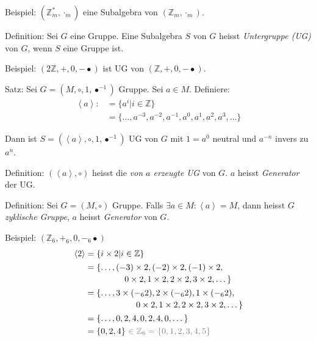 \documentclass[a4paper, ngerman, landscape, fleqn]{article}
\begin{document}
\begin{multicols*}{3}
Beispiel: $(\mathbb{Z}^*_m, \cdot_m)$ eine Subalgebra von $(\mathbb{Z}_m, \cdot_m)$.

Definition: Sei $G$ eine Gruppe. Eine Subalgebra $S$ von $G$ heisst \emph{Untergruppe (UG)} von $G$, wenn $S$ eine Gruppe ist.

Beispiel: $(2\mathbb{Z}, +, 0, -\bullet)$ ist UG von $(\mathbb{Z}, +, 0, -\bullet)$.

Satz: Sei $G = (M, \circ, 1, \bullet^{-1})$ Gruppe. Sei $a \in M$.
Definiere:
\begin{align*}
    \left< a \right> :&= \{ a^i | i \in \mathbb{Z} \} \\
                      &= \{ \dotsc, a^{-3}, a^{-2}, a^{-1}, a^{0}, a^1, a^2, a^3, \dotsc \}
\end{align*}

Dann ist $S = (\left< a \right>, \circ, 1, \bullet^{-1})$ UG von $G$ mit $1 = a^0$ neutral und $a^{-n}$ invers zu $a^n$.

Definition: $(\left<a\right>, \circ)$ heisst die \emph{von $a$ erzeugte UG} von $G$. $a$ heisst \emph{Generator} der UG.

Definition: Sei $G = (M, \circ)$ Gruppe. Falls $\exists a \in M : \left<a\right> = M$, dann heisst $G$ \emph{zyklische Gruppe}, $a$ heisst \emph{Generator} von $G$.

Beispiel: $(\mathbb{Z}_6, +_6, 0, -_6\bullet)$
\begin{align*}
    \left<2\right> &= \{ i \times 2 | i \in \mathbb{Z} \} \\
                   & \begin{multlined}
                       = \{ \dotsc, (-3) \times 2, (-2) \times 2, (-1) \times 2, \\
                           0 \times 2, 1 \times 2, 2 \times 2, 3 \times 2, \dotsc \}
                     \end{multlined} \\
                   & \begin{multlined}
                       = \{ \dotsc, 3 \times (-_6 2), 2 \times (-_6 2), 1 \times (-_6 2), \\
                       0 \times 2, 1 \times 2, 2 \times 2, 3 \times 2, \dotsc \}
                     \end{multlined} \\
                   &= \{ \dotsc, 0, 2, 4, 0, 2, 4, 0, \dotsc \} \\
                   &= \{ 0, 2, 4 \}\ \textcolor{gray}{\in \mathbb{Z}_6 = \{ 0, 1, 2, 3, 4, 5 \}}
\end{align*}


\end{multicols*}
\end{document}
